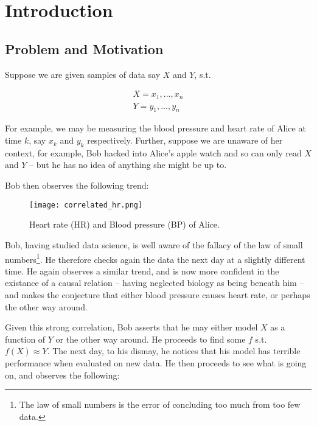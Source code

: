 
\chapter{Introduction}

\section{Problem and Motivation}

Suppose we are given samples of data say $X$ and $Y$, s.t.

\begin{align*}
    X = x_1, ..., x_n  \\
    Y = y_1, ..., y_n 
\end{align*}

For example, we may be measuring the blood pressure and heart rate of Alice at time $k$, 
say $x_k$ and $y_k$ respectively. Further, suppose we are unaware of her context, for example,
Bob hacked into Alice's apple watch and so can only read $X$ and $Y$ -- but he has no idea of 
anything she might be up to.

Bob then observes the following trend:

\begin{figure}[H]
    \centering
    \texttt{[image: correlated\_hr.png]}
    \caption{Heart rate (HR) and Blood pressure (BP) of Alice.}
\end{figure}

Bob, having studied data science, is well aware of the fallacy of the law of small numbers\footnote{
    The law of small numbers is the error of concluding too much from too few data. 
}. He therefore checks again the data the next day at a slightly different time. He again observes 
a similar trend, and is now more confident in the existance of a causal relation -- having neglected biology as 
being beneath him -- and makes the conjecture that either blood pressure causes heart rate, or 
perhaps the other way around. 

Given this strong correlation, Bob asserts that he may either model $X$ as a function of $Y$ or the other way 
around. He proceeds to find some $f$ s.t. $f(X) \approx Y$. The next day, to his dismay, he notices that his
model has terrible performance when evaluated on new data. He then proceeds to see what is going on, and 
observes the following:

